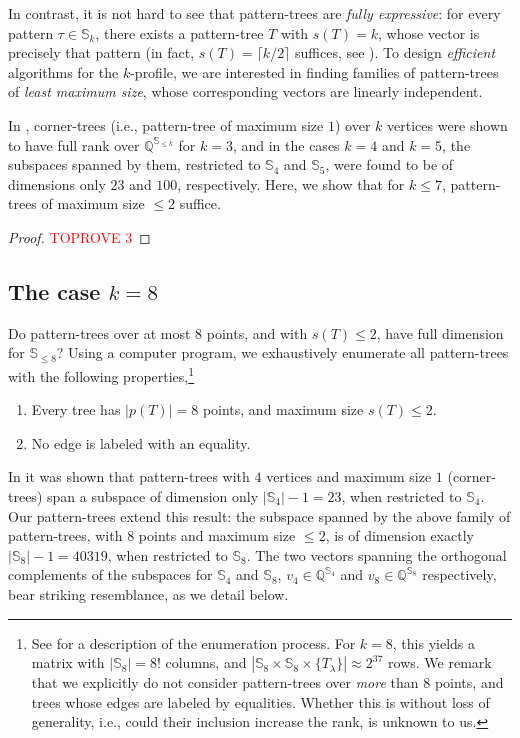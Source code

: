 \documentclass{article}
\newcommand{\QQ}{\mathbb{Q}}
\theoremstyle{remark}
\theoremstyle{plain}
\begin{document}
In contrast, it is not hard to see that pattern-trees are \textit{fully expressive}:
for every pattern $\tau \in \mathbb{S}_k$,
there exists a pattern-tree $T$ with $s(T)=k$, whose vector is precisely that pattern
(in fact, $s(T)=\lceil k/2 \rceil$ suffices, see ).
To design \textit{efficient} algorithms for the $k$-profile,
we are interested in finding families of pattern-trees of \textit{least maximum size},
whose corresponding vectors are linearly independent.

In \cite{even2021counting}, corner-trees (i.e., pattern-tree of maximum size $1$) over $k$ vertices
were shown to have full rank over $\QQ^{\mathbb{S}_{\le k}}$ for $k=3$, and
in the cases $k=4$ and $k=5$, the subspaces spanned by them,
restricted to $\mathbb{S}_4$ and $\mathbb{S}_5$,
were found to be of dimensions only $23$ and $100$, respectively.
Here, we show that for $k \le 7$, pattern-trees of maximum size $\le 2$ suffice. 

\begin{proof}\textcolor{red}{TOPROVE 3}\end{proof}

\subsection{The case \texorpdfstring{$k=8$}{k=8}}
\label{subsect:s_8_not_spanned}
Do pattern-trees over at most $8$ points, and with $s(T) \le 2$, have full dimension for $\mathbb{S}_{\le 8}$?
Using a computer program, we exhaustively enumerate all pattern-trees with the following properties,\footnote{
See  for a description of the enumeration process.
For $k=8$, this yields a matrix with $|\mathbb{S}_8|=8!$ columns, and $|\mathbb{S}_8 \times \mathbb{S}_8 \times \{ T_\lambda \}| \approx 2^{37}$ rows.
We remark that we explicitly do not consider pattern-trees over \textit{more} than $8$ points, and trees whose edges are labeled by equalities.
Whether this is without loss of generality, i.e., could their inclusion increase the rank, is unknown to us.
}
\begin{enumerate}
    \item Every tree has $|p(T)| = 8$ points, and maximum size $s(T) \le 2$. 
    \item No edge is labeled with an equality.
\end{enumerate}

In \cite{even2021counting} it was shown that pattern-trees with $4$ vertices and maximum size $1$ (corner-trees)
span a subspace of dimension only $|\mathbb{S}_4|-1 = 23$, when restricted to $\mathbb{S}_4$.
Our pattern-trees extend this result: 
the subspace spanned by the above family of pattern-trees,
with $8$ points and maximum size $\le 2$,
is of dimension exactly $|\mathbb{S}_8|-1 = 40319$, when restricted to $\mathbb{S}_8$.
The two vectors
spanning the orthogonal complements of the subspaces for $\mathbb{S}_4$ and $\mathbb{S}_8$,
$v_4 \in \QQ^{\mathbb{S}_4}$ and $v_8 \in \QQ^{\mathbb{S}_8}$ respectively,
bear striking resemblance, as we detail below.
\end{document}

